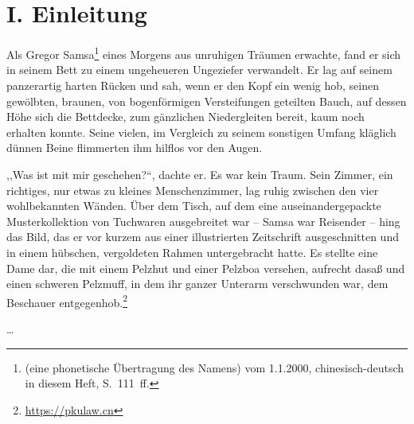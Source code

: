 

\printtitle

\section{I. Einleitung}

Als Gregor Samsa\footnote{ (eine phonetische Übertragung des Namens) vom 1.1.2000, chinesisch-deutsch in diesem Heft, S.~111~ff.} eines Morgens aus unruhigen Träumen erwachte, fand er sich in seinem Bett zu einem ungeheueren Ungeziefer verwandelt. Er lag auf seinem panzerartig harten Rücken und sah, wenn er den Kopf ein wenig hob, seinen gewölbten, braunen, von bogenförmigen Versteifungen geteilten Bauch, auf dessen Höhe sich die Bettdecke, zum gänzlichen Niedergleiten bereit, kaum noch erhalten konnte. Seine vielen, im Vergleich zu seinem sonstigen Umfang kläglich dünnen Beine flimmerten ihm hilflos vor den Augen.

,,Was ist mit mir geschehen?{}``, dachte er. Es war kein Traum. Sein Zimmer, ein richtiges, nur etwas zu kleines Menschenzimmer, lag ruhig zwischen den vier wohlbekannten Wänden. Über dem Tisch, auf dem eine auseinandergepackte Musterkollektion von Tuchwaren ausgebreitet war -- Samsa war Reisender -- hing das Bild, das er vor kurzem aus einer illustrierten Zeitschrift ausgeschnitten und in einem hübschen, vergoldeten Rahmen untergebracht hatte. Es stellte eine Dame dar, die mit einem Pelzhut und einer Pelzboa versehen, aufrecht dasaß und einen schweren Pelzmuff, in dem ihr ganzer Unterarm verschwunden war, dem Beschauer entgegenhob.\footnote{\url{https://pkulaw.cn}}

\ldots{}

